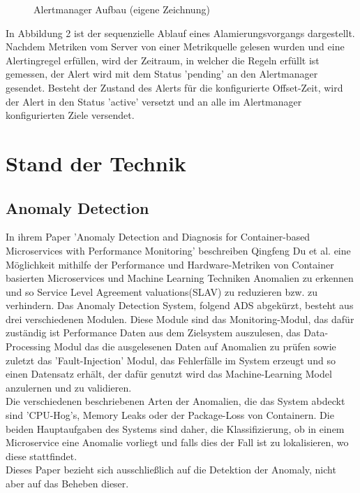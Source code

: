 \documentclass[a4paper,10pt]{scrartcl}
\begin{document}
\begin{figure}[htbp]
  \centering
  \scalebox{.8}{}
  \caption{Alertmanager Aufbau (eigene Zeichnung)}
\end{figure}

In Abbildung 2 ist der sequenzielle Ablauf eines Alamierungsvorgangs dargestellt. Nachdem Metriken vom Server von einer Metrikquelle gelesen wurden und eine Alertingregel erfüllen, wird der Zeitraum, in welcher die Regeln erfüllt ist gemessen, der Alert wird mit dem Status 'pending' an den Alertmanager gesendet. Besteht der Zustand des Alerts für die konfigurierte Offset-Zeit, wird der Alert in den Status 'active' versetzt und an alle im Alertmanager konfigurierten Ziele versendet.

\pagebreak

\section{Stand der Technik}

\subsection{Anomaly Detection}
In ihrem Paper 'Anomaly Detection and Diagnosis for Container-based Microservices with Performance Monitoring' beschreiben Qingfeng Du et al. eine Möglichkeit mithilfe der Performance und Hardware-Metriken von Container basierten Microservices und Machine Learning Techniken  Anomalien zu erkennen und so Service Level Agreement valuations(SLAV) zu reduzieren bzw. zu verhindern. Das Anomaly Detection System, folgend ADS abgekürzt, besteht aus drei verschiedenen Modulen. Diese Module sind das Monitoring-Modul, das dafür zuständig ist Performance Daten aus dem Zielsystem auszulesen, das Data-Processing Modul das die ausgelesenen Daten auf Anomalien zu prüfen sowie zuletzt das 'Fault-Injection' Modul, das Fehlerfälle im System erzeugt und so einen Datensatz erhält, der dafür genutzt wird das Machine-Learning Model anzulernen und zu validieren.\\
Die verschiedenen beschriebenen Arten der Anomalien, die das System abdeckt sind 'CPU-Hog's, Memory Leaks oder der Package-Loss von Containern. Die beiden Hauptaufgaben des Systems sind daher, die Klassifizierung, ob in einem Microservice eine Anomalie vorliegt und falls dies der Fall ist zu lokalisieren, wo diese stattfindet.\\
Dieses Paper bezieht sich ausschließlich auf die Detektion der Anomaly, nicht aber auf das Beheben dieser.
\end{document}
